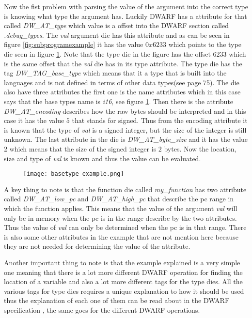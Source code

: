Now the fist problem with parsing the value of the argument into the correct type is knowing what type the argument has.
Luckily \gls{DWARF} has a attribute for that called \emph{DW\_AT\_type} which value is a offset into the \gls{DWARF} section called \emph{.debug\_types}.
The \emph{val} argument \gls{die} has this attribute and as can be seen in figure \ref{fig:subprogramexample} it has the value $0x6233$ which points to the type \gls{die} seen in figure \ref{fig:basetypeexample}.
Note that the type \gls{die} in the figure has the offset $6233$ which is the same offset that the \emph{val} \gls{die} has in its type attribute.
The type \gls{die} has the tag \emph{DW\_TAG\_base\_type} which means that it a type that is built into the languages and is not defined in terms of other data types(see \cite{dwarf} page 75).
The \gls{die} also have three attributes the first one is the name attributes which in this case says that the base types name is \emph{i16}, see figure \ref{fig:basetypeexample}.
Then there is the attribute \emph{DW\_AT\_encoding} describes how the raw bytes should be interpreted and in this case it has the value $5$ that stands for signed.
Thus from the encoding attribute it is known that the type of \emph{val} is a signed integer, but the size of the integer is still unknown.
The last attribute in the \gls{die} is \emph{DW\_AT\_byte\_size} and it has the value $2$ which means that the size of the signed integer is $2$ bytes.
Now the location, size and type of \emph{val} is known and thus the value can be evaluated.


\begin{figure}[h]
    \centering
    \texttt{[image: basetype-example.png]}
    \label{fig:basetypeexample}
\end{figure}


A key thing to note is that the function \gls{die} called \emph{my\_function} has two attribute called \emph{DW\_AT\_low\_pc} and \emph{DW\_AT\_high\_pc} that describe the \gls{pc} range in which the function applies.
This means that the value of the argument \emph{val} will only be in memory when the \gls{pc} is in the range describe by the two attributes.
Thus the value of \emph{val} can only be determined when the \gls{pc} is in that range.
There is also some other attributes in the example that are not mention here because they are not needed for determining the value of the attribute.

Another important thing to note is that the example explained is a very simple one meaning that there is a lot more different \gls{DWARF} operation for finding the location of a variable and also a lot more different tags for the type \glspl{die}.
All the various tags for type dies requires a unique explanation to how it should be used thus the explanation of each one of them can be read about in the \gls{DWARF} specification \cite{dwarf}, the same goes for the different \gls{DWARF} operations.

